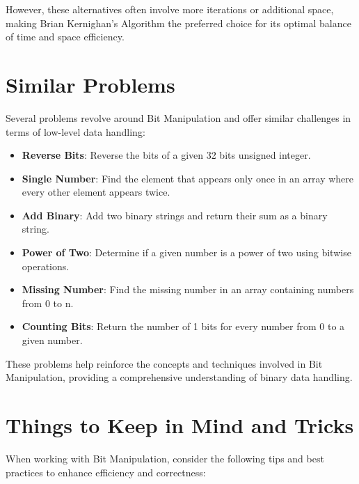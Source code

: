However, these alternatives often involve more iterations or additional space, making Brian Kernighan’s Algorithm the preferred choice for its optimal balance of time and space efficiency.

\section*{Similar Problems}

Several problems revolve around Bit Manipulation and offer similar challenges in terms of low-level data handling:

\begin{itemize}
    \item \textbf{Reverse Bits}: Reverse the bits of a given 32 bits unsigned integer.
    \item \textbf{Single Number}: Find the element that appears only once in an array where every other element appears twice.
    \item \textbf{Add Binary}: Add two binary strings and return their sum as a binary string.
    \item \textbf{Power of Two}: Determine if a given number is a power of two using bitwise operations.
    \item \textbf{Missing Number}: Find the missing number in an array containing numbers from 0 to n.
    \item \textbf{Counting Bits}: Return the number of 1 bits for every number from 0 to a given number.
\end{itemize}

These problems help reinforce the concepts and techniques involved in Bit Manipulation, providing a comprehensive understanding of binary data handling.

\section*{Things to Keep in Mind and Tricks}

When working with Bit Manipulation, consider the following tips and best practices to enhance efficiency and correctness:

